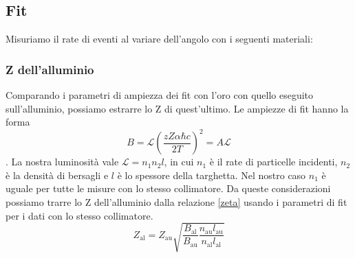 \subsection{Fit}

Misuriamo il rate di eventi al variare dell'angolo con i seguenti materiali:




\subsubsection{Z dell'alluminio}

Comparando i parametri di ampiezza dei fit con l'oro con quello eseguito sull'alluminio, possiamo estrarre lo Z di quest'ultimo. Le ampiezze di fit hanno la forma $$ B=\mathcal{L} \left( \frac {zZ\alpha\hbar c} {2T} \right)^2 = A \mathcal{L} $$.
La nostra luminosità vale $\mathcal{L}=n_1 n_2 l$, in cui $n_1$ è il rate di particelle incidenti, $n_2$  è la densità di bersagli e $l$ è lo spessore della targhetta.
Nel nostro caso $n_1$ è uguale per tutte le misure con lo stesso collimatore.   
Da queste considerazioni possiamo trarre lo Z dell'alluminio dalla relazione \eqref{zeta} usando i parametri di fit per i dati con lo stesso collimatore.
\begin{equation}
Z_{\text{al}}=Z_{\text{au}} \sqrt{ \frac{B_{\text{al}}}{B_{\text{au}}} \frac{n_{\text{au}} l_{\text{au}}}{n_{\text{al}} l_{\text{al}}} }
\label{zeta}
\end{equation}